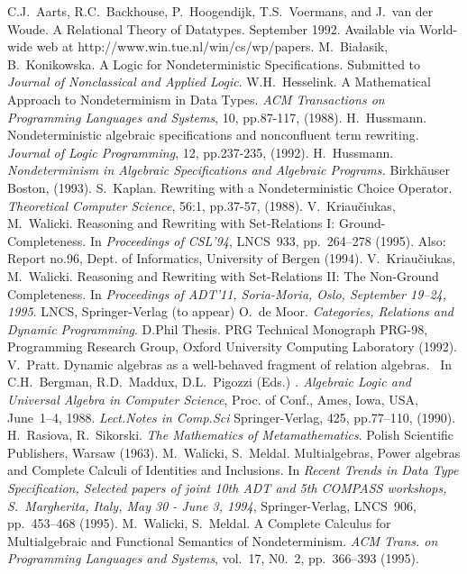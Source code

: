 \begin{thebibliography}{MM99}
 C.J.~Aarts, R.C.~Backhouse, P.~Hoogendijk,
   T.S.~Voermans, and J.~van der Woude.  A Relational Theory of Datatypes.
   September 1992.  Available via World-wide web at {\sf
   http://www.win.tue.nl/win/cs/wp/papers}.
 M.~Bia{\l}asik, B.~Konikowska. A Logic for
   Nondeterministic Specifications. Submitted to {\it Journal  of
   Nonclassical and Applied Logic}.
 W.H.~Hesselink. A Mathematical Approach to Nondeterminism
   in Data Types. {\em ACM Transactions on Programming Languages and Systems},
   10, pp.87-117, (1988).
 H.~Hussmann. Nondeterministic algebraic
   specifications and nonconfluent term rewriting. {\em Journal of Logic
   Programming}, 12, pp.237-235, (1992).
 H.~Hussmann. 
   {\em Nondeterminism in Algebraic Specifications and Algebraic Programs.}
   Birkh\"auser Boston, (1993).
 S.~Kaplan. Rewriting with a Nondeterministic Choice
   Operator. {\it Theoretical Computer Science}, 56:1, pp.37-57, (1988).
 V.~Kriau\v ciukas, M.~Walicki.  Reasoning and Rewriting
   with Set-Relations I: Ground-Completeness.  In {\it Proceedings of
   CSL'94}, LNCS~933, pp.~264--278 (1995).  Also: Report no.96, Dept. of
   Informatics, University of Bergen (1994).
 V.~Kriau\v ciukas, M.~Walicki.  Reasoning and Rewriting
   with Set-Relations II: The Non-Ground Completeness.  In {\it Proceedings of
   ADT'11, Soria-Moria, Oslo, September 19--24, 1995}. LNCS, Springer-Verlag
   (to appear)
 O.~de Moor. {\it Categories, Relations and Dynamic
   Programming}.  D.Phil Thesis. PRG Technical Monograph PRG-98, Programming
   Research Group, Oxford University Computing Laboratory (1992).
 V.~Pratt. Dynamic algebras as a well-behaved fragment
   of relation algebras. \ In C.H.~Bergman, R.D.~Maddux, D.L.~Pigozzi (Eds.)%
   {\it. Algebraic Logic and Universal Algebra in Computer Science}, Proc. of
   Conf., Ames, Iowa, USA, June~1--4, 1988. {\it Lect.Notes in Comp.Sci}
   Springer-Verlag, 425, pp.77--110, (1990).
 H.~Rasiova, R.~Sikorski. {\it The Mathematics of
   Metamathematics}. Polish Scientific Publishers, Warsaw (1963).
 M.~Walicki, S.~Meldal. Multialgebras, Power algebras
   and Complete Calculi of Identities and Inclusions. In {\it Recent Trends
   in Data Type Specification, Selected papers of joint 10th ADT and 5th
   COMPASS workshops, S.~Margherita, Italy, May 30 - June 3, 1994},
   Springer-Verlag, LNCS~906, pp.~453--468 (1995).
 M.~Walicki, S.~Meldal. A Complete Calculus for 
   Multialgebraic and Functional Semantics of Nondeterminism. 
   {\it ACM Trans. on Programming Languages and Systems}, vol.~17, N0.~2,
   pp.~366--393 (1995).
\end{thebibliography} 

